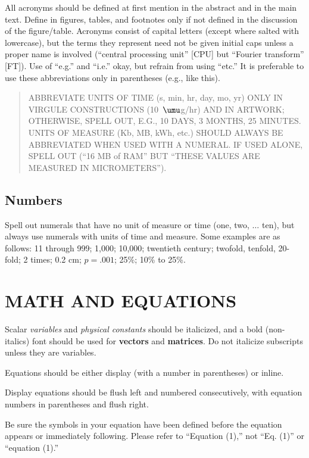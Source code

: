 \documentclass{IEEEcsmag}
\begin{document}
All acronyms should be defined at first mention in the abstract and in the main text. Define in figures, tables, and footnotes only if not defined in the discussion of the figure/table. Acronyms consist of capital letters (except where salted with lowercase), but the terms they represent need not be given initial caps unless a proper name is involved (``central processing unit'' [CPU] but ``Fourier transform'' [FT]). Use of ``e.g.'' and ``i.e.'' okay, but refrain from using ``etc.'' It is preferable to use these abbreviations only in parentheses (e.g., like this).

\begin{quote}
ABBREVIATE UNITS OF TIME (s, min, hr, day, mo, yr) ONLY IN VIRGULE CONSTRUCTIONS (10~$\umu$g/hr) AND IN ARTWORK; OTHERWISE, SPELL OUT, E.G., 10 DAYS, 3 MONTHS, 25 MINUTES. UNITS OF MEASURE (Kb, MB, kWh, etc.) SHOULD ALWAYS BE ABBREVIATED WHEN USED WITH A NUMERAL. IF USED ALONE, SPELL OUT (``16 MB of RAM'' BUT ``THESE VALUES ARE MEASURED IN MICROMETERS'').
\end{quote}

\subsection{Numbers}

Spell out numerals that have no unit of measure or time (one, two, $\ldots$ ten), but always use numerals with units of time and measure. Some examples are as follows: 11 through 999; 1,000; 10,000; twentieth century; twofold, tenfold, 20-fold; 2 times; 0.2 cm; $p = .001$; 25\%; 10\% to 25\%.

\section{MATH AND EQUATIONS}

Scalar {\it variables} and {\it physical constants} should be italicized, and a bold (non-italics) font should be used for {\bf vectors} and {\bf matrices}. Do not italicize subscripts unless they are variables.

Equations should be either display (with a number in parentheses) or inline.   


Display equations should be flush left and numbered consecutively, with equation numbers in parentheses and flush right.

Be sure the symbols in your equation have been defined before the equation appears or immediately following. Please refer to ``Equation (1),'' not ``Eq. (1)'' or ``equation (1).''
\end{document}
